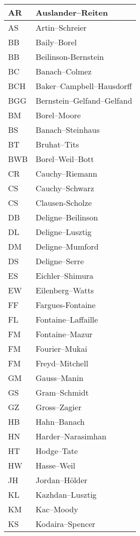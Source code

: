 \documentclass{amsart}
\numberwithin{equation}{section}
\theoremstyle{plain}
\numberwithin{equation}{section}
\theoremstyle{remark}
\begin{document}
\begin{longtable}{l|l}
\hline
AR & Auslander--Reiten  \\ \hline
AS & Artin--Schreier\\ \hline
BB & Baily--Borel\\ \hline
BB & Beilinson-Bernstein\\ \hline
BC & Banach--Colmez\\ \hline
BCH & Baker--Campbell--Hausdorff\\ \hline
BGG  & Bernstein--Gelfand--Gelfand\\ \hline
BM & Borel–Moore\\ \hline
BS & Banach--Steinhaus\\ \hline
BT & Bruhat--Tits\\ \hline
BWB & Borel--Weil--Bott\\ \hline
CR & Cauchy--Riemann\\ \hline
CS & Cauchy--Schwarz\\ \hline
CS & Clausen-Scholze\\ \hline
DB & Deligne--Beilinson\\ \hline
DL & Deligne--Lusztig\\ \hline
DM & Deligne--Mumford\\ \hline
DS & Deligne--Serre \\ \hline
ES & Eichler--Shimura\\ \hline
EW & Eilenberg--Watts\\ \hline
FF & Fargues-Fontaine\\ \hline
FL & Fontaine--Laffaille\\ \hline
FM & Fontaine--Mazur\\ \hline
FM & Fourier--Mukai\\ \hline
FM & Freyd--Mitchell\\ \hline
GM & Gauss--Manin\\ \hline
GS & Gram--Schmidt\\ \hline
GZ & Gross--Zagier\\ \hline
HB & Hahn--Banach\\ \hline
HN & Harder--Narasimhan\\ \hline
HT & Hodge--Tate\\ \hline
HW & Hasse--Weil\\ \hline
JH & Jordan--Hölder\\ \hline
KL & Kazhdan--Lusztig \\ \hline
KM  & Kac--Moody\\ \hline
KS & Kodaira--Spencer\\ \hline

\end{longtable}
\end{document}
